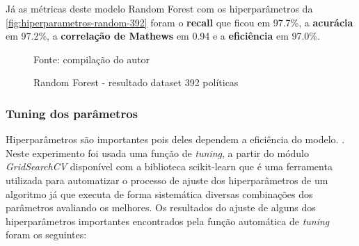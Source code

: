 Já as métricas deste modelo Random Forest com os hiperparâmetros da \autoref{fig:hiperparametros-random-392} foram o \textbf{recall} que ficou em 97.7\%, a \textbf{acurácia} em 97.2\%, a \textbf{correlação de Mathews} em 0.94 e a \textbf{eficiência} em 97.0\%. 

\begin{figure}[h!]
	\centering
	\caption{Random Forest - resultado dataset 392 políticas}
	
	\label{fig:hiperparametros-random-392}
	{\scriptsize Fonte: compilação do autor}
\end{figure}

\subsubsection{Tuning dos parâmetros}\label{exp:tuning}
Hiperparâmetros são importantes pois deles dependem a eficiência do modelo. \cite[pp. 31-48 ]{kumar_ensemble_2020}. Neste experimento foi usada uma função de \textit{tuning}, a partir do módulo \textit{GridSearchCV} disponível com a biblioteca scikit-learn   que é uma ferramenta utilizada para automatizar o processo de ajuste dos hiperparâmetros de um algoritmo já que executa de forma sistemática diversas combinações dos parâmetros avaliando os melhores. Os resultados do ajuste de alguns dos hiperparâmetros importantes encontrados pela função automática de \textit{tuning} foram os seguintes:

